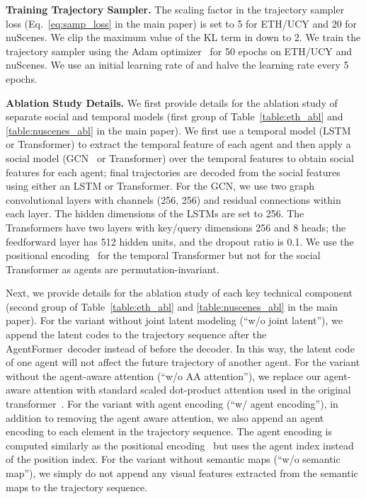 \documentclass[10pt,twocolumn,letterpaper]{article}
\newcommand{\mname}{AgentFormer}
\begin{document}
\vspace{2mm}
\noindent\textbf{Training Trajectory Sampler.}
The scaling factor  in the trajectory sampler loss  (Eq.~\eqref{eq:samp_loss} in the main paper) is set to 5 for ETH/UCY and 20 for nuScenes. We clip the maximum value of the KL term in  down to 2. We train the trajectory sampler using the Adam optimizer~\cite{kingma2014adam} for 50 epochs on ETH/UCY and nuScenes. We use an initial learning rate of  and halve the learning rate every 5 epochs.


\vspace{2mm}
\noindent\textbf{Ablation Study Details.}
We first provide details for the ablation study of separate social and temporal models (first group of Table~\ref{table:eth_abl} and \ref{table:nuscenes_abl} in the main paper). We first use a temporal model (LSTM or Transformer) to extract the temporal feature of each agent and then apply a social model (GCN~\cite{kipf2016semi} or Transformer) over the temporal features to obtain social features for each agent; final trajectories are decoded from the social features using either an LSTM or Transformer. For the GCN, we use two graph convolutional layers with channels (256, 256) and residual connections within each layer. The hidden dimensions of the LSTMs are set to 256. The Transformers have two layers with key/query dimensions 256 and 8 heads; the feedforward layer has 512 hidden units, and the dropout ratio is 0.1. We use the positional encoding~\cite{vaswani2017attention} for the temporal Transformer but not for the social Transformer as agents are permutation-invariant.

Next, we provide details for the ablation study of each key technical component (second group of Table~\ref{table:eth_abl} and \ref{table:nuscenes_abl} in the main paper). For the variant without joint latent modeling (``w/o joint latent''), we append the latent codes to the trajectory sequence after the \mname\ decoder instead of before the decoder. In this way, the latent code of one agent will not affect the future trajectory of another agent. For the variant without the agent-aware attention (``w/o AA attention''), we replace our agent-aware attention with standard scaled dot-product attention used in the original transformer~\cite{vaswani2017attention}. For the variant with agent encoding (``w/ agent encoding''), in addition to removing the agent aware attention, we also append an agent encoding to each element in the trajectory sequence. The agent encoding is computed similarly as the positional encoding~\cite{vaswani2017attention} but uses the agent index instead of the position index. For the variant without semantic maps (``w/o semantic map''), we simply do not append any visual features extracted from the semantic maps to the trajectory sequence.
\end{document}
